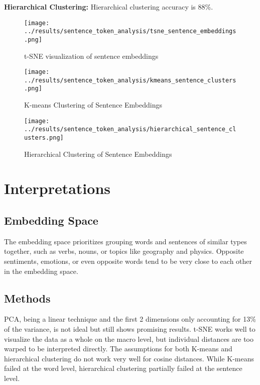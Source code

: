 \documentclass{scrartcl}
\begin{document}
\textbf{Hierarchical Clustering:} Hierarchical clustering accuracy is 88\%.

\begin{figure}[H]
    \centering
    \texttt{[image: ../results/sentence\_token\_analysis/tsne\_sentence\_embeddings.png]}
    \caption{t-SNE visualization of sentence embeddings}
\end{figure}

\begin{figure}[H]
    \centering
    \texttt{[image: ../results/sentence\_token\_analysis/kmeans\_sentence\_clusters.png]}
    \caption{K-means Clustering of Sentence Embeddings}
\end{figure}

\begin{figure}[H]
    \centering
    \texttt{[image: ../results/sentence\_token\_analysis/hierarchical\_sentence\_clusters.png]}
    \caption{Hierarchical Clustering of Sentence Embeddings}
\end{figure}

\section{Interpretations}
\subsection{Embedding Space}
The embedding space prioritizes grouping words and sentences of similar types together, such as verbs, nouns, or topics like geography and physics. Opposite sentiments, emotions, or even opposite words tend to be very close to each other in the embedding space.

\subsection{Methods}
PCA, being a linear technique and the first 2 dimensions only accounting for 13\% of the variance, is not ideal but still shows promising results. t-SNE works well to visualize the data as a whole on the macro level, but individual distances are too warped to be interpreted directly. The assumptions for both K-means and hierarchical clustering do not work very well for cosine distances. While K-means failed at the word level, hierarchical clustering partially failed at the sentence level.
\end{document}
